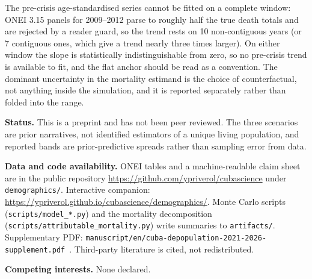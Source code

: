 \documentclass[11pt,a4paper]{article}
\begin{document}
The pre-crisis age-standardised series cannot be fitted on a complete window: ONEI 3.15 panels for 2009--2012 parse to roughly half the true death totals and are rejected by a reader guard, so the trend rests on 10 non-contiguous years (or 7 contiguous ones, which give a trend nearly three times larger). On either window the slope is statistically indistinguishable from zero, so no pre-crisis trend is available to fit, and the flat anchor should be read as a convention.
The dominant uncertainty in the mortality estimand is the choice of counterfactual, not anything inside the simulation, and it is reported separately rather than folded into the range.

\textbf{Status.}
This is a preprint and has not been peer reviewed.
The three scenarios are prior narratives, not identified estimators of a unique living population, and reported bands are prior-predictive spreads rather than sampling error from data.

\textbf{Data and code availability.}
ONEI tables and a machine-readable claim sheet are in the public repository
\url{https://github.com/ypriverol/cubascience} under \texttt{demographics/}.
Interactive companion: \url{https://ypriverol.github.io/cubascience/demographics/}.
Monte Carlo scripts (\texttt{scripts/model\_*.py}) and the mortality decomposition
(\texttt{scripts/attributable\_mortality.py}) write summaries to \texttt{artifacts/}.
Supplementary PDF: \texttt{manuscript/en/cuba-depopulation-2021-2026-supplement.pdf}~\citep{modele_supp}.
Third-party literature is cited, not redistributed.

\textbf{Competing interests.}
None declared.

\FloatBarrier


\end{document}
